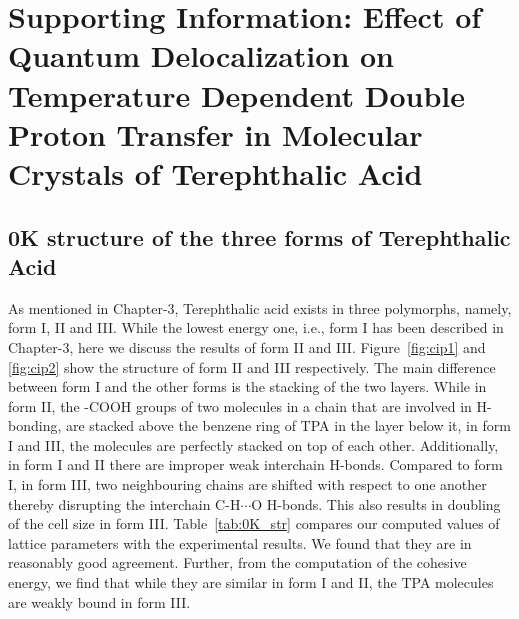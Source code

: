 \chapter{Supporting Information: Effect of Quantum Delocalization on Temperature 
Dependent Double Proton Transfer in Molecular Crystals of Terephthalic Acid} \label{appendix4}

\section{0K structure of the three forms of Terephthalic Acid}
\label{form-si}

As mentioned in Chapter-3, Terephthalic acid exists in three polymorphs, namely, form I, II and 
III. While the lowest energy one, i.e., form I has been described in Chapter-3, here we discuss
the results of form II and III. Figure~\ref{fig:cip1} and \ref{fig:cip2} show the structure of form II
and III respectively. The main difference between form I and the other forms is the stacking of the
two layers. While in form II, the -COOH groups of two molecules in a chain that are involved in 
H-bonding, are stacked above the benzene ring of TPA in the layer below it, in form I and III, the
molecules are perfectly stacked on top of each other. Additionally, in form I and II there are
improper weak interchain H-bonds. Compared to form I, in form III, two neighbouring chains are shifted
with respect to one another thereby disrupting the interchain C-H$\cdots$O H-bonds. This also results in doubling of the cell size in form III. Table~\ref{tab:0K_str} compares our computed values of lattice
parameters with the experimental results. We found that they are in reasonably good agreement.
Further, from the computation of the cohesive energy, we find that while they are similar in form I
and II, the TPA molecules are weakly bound in form III.  


